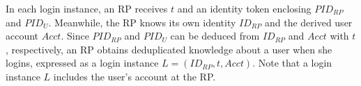 {{%




\vspace{1mm}

In each login instance, an RP receives $t$ %
and an identity token %
enclosing $PID_{RP}$ and $PID_U$. Meanwhile, the RP knows its own identity $ID_{RP}$ and the derived user account $Acct$.
Since $PID_{RP}$ and $PID_U$ can be deduced from $ID_{RP}$ and $Acct$ with $t$, respectively,
 an RP obtains deduplicated knowledge about a user when she logins,
  expressed as a login instance $L=(ID_{RP}, t, Acct)$.
Note that a login instance $L$ includes the user's account at the RP.


}}
